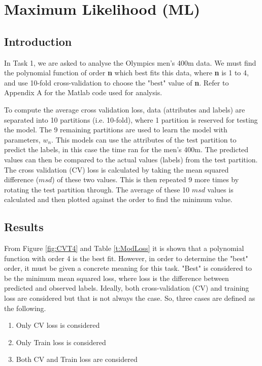 \section{Maximum Likelihood (ML)}{\label{s1}
	
\subsection{Introduction}\label{Int}
In Task 1, we are asked to analyse the Olympics men's 400m data. We must find the polynomial function of order \textbf{n} which best fits this data, where \textbf{n} is 1 to 4, and use 10-fold cross-validation to choose the "best" value of \textbf{n}. Refer to Appendix A for the Matlab code used for analysis.

To compute the average cross validation loss, data (attributes and labels) are separated into 10 partitions (i.e. 10-fold), where 1 partition is reserved for testing the model. The 9 remaining partitions are used to learn the model with parameters, $w_{n}$. This models can use the attributes of the test partition to predict the labels, in this case the time ran for the men's 400m. The predicted values can then be compared to the actual values (labels)  from the test partition. The cross validation (CV) loss is calculated by taking the mean squared difference ($msd$) of these two values. This is then repeated 9 more times by rotating the test partition through. The average of these 10 $msd$ values is calculated and then plotted against the order to find the minimum value.
\subsection{Results}\label{CVcons}
From Figure \ref{fig:CVT4} and Table \ref{t:ModLoss} it is shown that a polynomial function with order 4 is the best fit. However, in order to determine the "best" order, it must be given a concrete meaning for this task. "Best" is considered to be the minimum mean squared loss, where loss is the difference between predicted and observed labels. Ideally, both cross-validation (CV) and training loss are considered but that is not always the case. So, three cases are defined as the following.

\begin{enumerate}
	\item Only CV loss is considered
	\item Only Train loss is considered
	\item Both CV and Train loss are considered
\end{enumerate}

}
